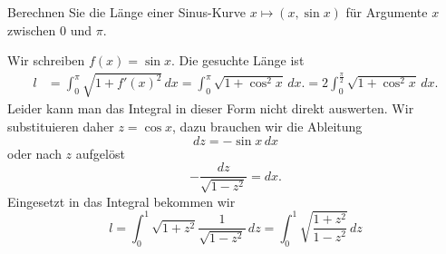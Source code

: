 Berechnen Sie die Länge einer Sinus-Kurve
$x\mapsto (x,\sin x)$
für Argumente $x$ zwischen $0$ und $\pi$.

\begin{loesung}
Wir schreiben $f(x)=\sin x$.
Die gesuchte Länge ist
\begin{align*}
l
&=
\int_0^\pi\sqrt{1 + f'(x)^2}\,dx
=
\int_0^\pi\sqrt{1 + \cos^2x}\,dx.
=
2
\int_0^{\frac\pi2}\sqrt{1 + \cos^2x}\,dx.
\end{align*}
Leider kann man das Integral in dieser Form nicht direkt 
auswerten.
Wir substituieren daher $z=\cos x$, dazu brauchen wir die
Ableitung
\[
dz=-\sin x\,dx
\]
oder nach $z$ aufgelöst
\[
-\frac{dz}{\sqrt{1-z^2}}=dx.
\]
Eingesetzt in das Integral bekommen wir
\[
l=
\int_0^1 \sqrt{1+z^2}\frac1{\sqrt{1-z^2}}\,dz
=
\int_0^1 \sqrt{\frac{1+z^2}{1-z^2}}\,dz
\]
\end{loesung}


